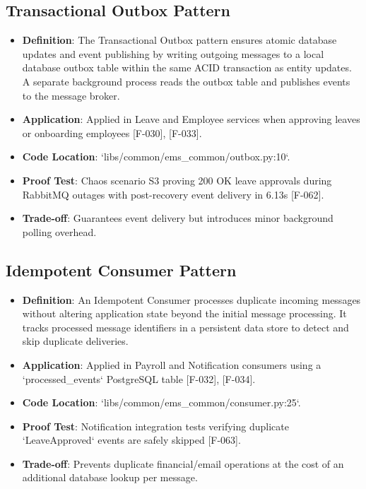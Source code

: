 \documentclass[11pt,a4paper]{article}
\begin{document}
\subsection{Transactional Outbox Pattern}
\begin{itemize}
    \item \textbf{Definition}: The Transactional Outbox pattern ensures atomic database updates and event publishing by writing outgoing messages to a local database outbox table within the same ACID transaction as entity updates. A separate background process reads the outbox table and publishes events to the message broker.
    \item \textbf{Application}: Applied in Leave and Employee services when approving leaves or onboarding employees [F-030], [F-033].
    \item \textbf{Code Location}: `libs/common/ems\_common/outbox.py:10`.
    \item \textbf{Proof Test}: Chaos scenario S3 proving 200 OK leave approvals during RabbitMQ outages with post-recovery event delivery in 6.13s [F-062].
    \item \textbf{Trade-off}: Guarantees event delivery but introduces minor background polling overhead.
\end{itemize}

\subsection{Idempotent Consumer Pattern}
\begin{itemize}
    \item \textbf{Definition}: An Idempotent Consumer processes duplicate incoming messages without altering application state beyond the initial message processing. It tracks processed message identifiers in a persistent data store to detect and skip duplicate deliveries.
    \item \textbf{Application}: Applied in Payroll and Notification consumers using a `processed\_events` PostgreSQL table [F-032], [F-034].
    \item \textbf{Code Location}: `libs/common/ems\_common/consumer.py:25`.
    \item \textbf{Proof Test}: Notification integration tests verifying duplicate `LeaveApproved` events are safely skipped [F-063].
    \item \textbf{Trade-off}: Prevents duplicate financial/email operations at the cost of an additional database lookup per message.
\end{itemize}
\end{document}
